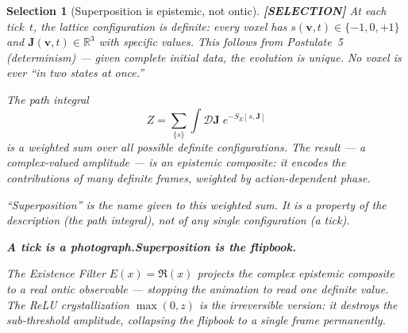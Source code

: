 \documentclass[11pt]{article}
\theoremstyle{tight}
\theoremstyle{plainroman}
\newtheorem{selection}[theorem]{Selection}
\newcommand{\R}{\mathbb{R}}
\begin{document}
\begin{selection}[Superposition is epistemic, not ontic]\label{sel:superposition}
\textbf{[SELECTION]}
At each tick~$t$, the lattice configuration is \emph{definite}: every voxel has $s(\mathbf v,t)\in\{-1,0,+1\}$ and $\mathbf J(\mathbf v,t)\in\R^3$ with specific values.
This follows from Postulate~5 (determinism) --- given complete initial data, the evolution is unique.
No voxel is ever ``in two states at once.''

The path integral
\[
Z=\sum_{\{s\}}\int\mathcal D\mathbf J\;e^{-S_E[s,\mathbf J]}
\]
is a weighted sum over \emph{all possible} definite configurations.
The result --- a complex-valued amplitude --- is an epistemic composite: it encodes the contributions of many definite frames, weighted by action-dependent phase.

``Superposition'' is the name given to this weighted sum.
It is a property of the \emph{description} (the path integral), not of any single \emph{configuration} (a tick).

\medskip
\noindent\textbf{A tick is a photograph.\quad Superposition is the flipbook.}
\medskip

The Existence Filter $E(x)=\Re(x)$ projects the complex epistemic composite to a real ontic observable --- stopping the animation to read one definite value.
The ReLU crystallization $\max(0,z)$ is the irreversible version: it destroys the sub-threshold amplitude, collapsing the flipbook to a single frame permanently.
\end{selection}
\end{document}
